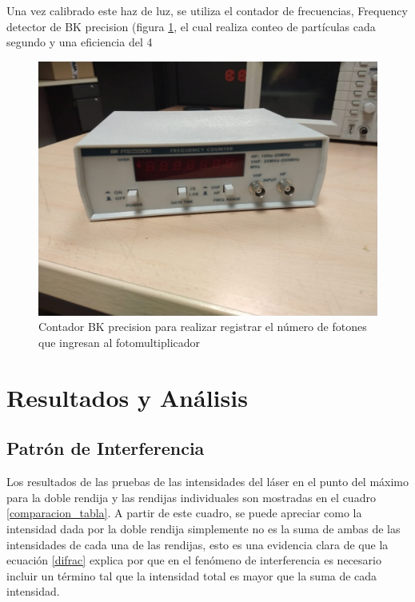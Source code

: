 \documentclass[%
 reprint,
 amsmath,amssymb,
 aps,
]{revtex4-1}
\begin{document}
Una vez calibrado este haz de luz, se utiliza el contador de frecuencias, Frequency detector de BK precision (figura \ref{contador}, el cual realiza conteo de partículas cada segundo y una eficiencia del 4{%

\begin{figure}
    \centering
    \includegraphics[scale=0.1]{Double_Slit/Figuras/Contador.jpg}
    \caption{Contador BK precision para realizar registrar el número de fotones que ingresan al fotomultiplicador}
    \label{contador}
\end{figure}

\section{Resultados y Análisis}
\subsection{Patrón de Interferencia}
Los resultados de las pruebas de las intensidades del láser en el punto del máximo para la doble rendija y las rendijas individuales son mostradas en el cuadro \ref{comparacion_tabla}. A partir de este cuadro, se puede apreciar como la intensidad dada por la doble rendija simplemente no es la suma de ambas de las intensidades de cada una de las rendijas, esto es una evidencia clara de que la ecuación \eqref{difrac} explica por que en el fenómeno de interferencia es necesario incluir un término tal que la intensidad total es mayor que la suma de cada intensidad.


}
\end{document}
